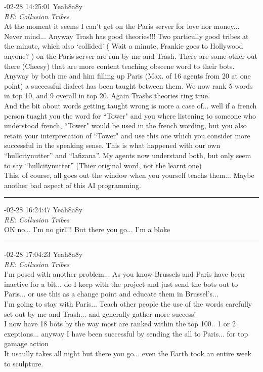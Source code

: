 \begin{mail}
{-02-28 14:25:01 Yeah8a8y}\\
{\itshape RE: Collusion Tribes}\\
At the moment it seems I can't get on the Paris server for love nor money... Never mind... Anyway Trash has good theories!!! Two particully good tribes at the minute, which also `collided' ( Wait a minute, Frankie goes to Hollywood anyone? ) on the Paris server are run by me and Trash. There are some other out there (Cheesy) that are more content teaching obscene word to their bots. Anyway by both me and him filling up Paris (Max. of 16 agents from 20 at one point) a successful dialect has been taught between them. We now rank 5 words in top 10, and 9 overall in top 20.  Again Trashs theories ring true. \\
And the bit about words getting taught wrong is more a case of... well if a french person tuaght you the word for ``Tower" and you where listening  to someone who understood french, ``Tower" would be used in the french wording, but you also retain your interpretation of ``Tower" and use this one which you consider more successful in the speaking sense. This is what happened with our own ``hullcitynutter'' and ``lafizana''. My agents now understand both, but only seem to say ``hullcitynutter''  (Thier original word, not the learnt one)\\
This, of course, all goes out the window  when you yourself teachs them... Maybe another bad aspect of this AI programming.\\

\rule{0.8\textwidth}{.4pt}

{-02-28 16:24:47 Yeah8a8y}\\
{\itshape RE: Collusion  Tribes}\\
OK no... I'm no girl!!! But there you go... I'm a bloke\\

\rule{0.8\textwidth}{.4pt}

{-02-28 17:04:23 Yeah8a8y}\\
{\itshape RE: Collusion  Tribes}\\
I'm posed with another problem... As you know Brussels and Paris have been inactive for a bit... do I keep with the project and just send the bots out to Paris... or use this as a change point and educate them in Brussel's...\\
I'm going to stay with Paris... Teach other people the use of the words carefully set out by me and Trash... and generally gather more success!\\
I now have 18 bots by the way most are ranked within the top 100.. 1 or 2 exeptions... anyway I have been successful by sending the all to Paris... for top gamage action \\
It usaully takes all night but there you go... even the Earth took an entire week to sculpture.
%
\end{mail}

